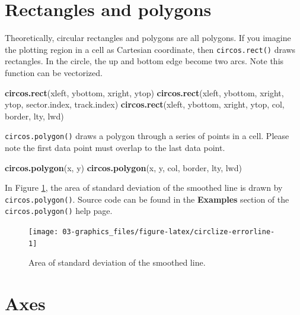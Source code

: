 \documentclass[]{book}
\newenvironment{Shaded}{\begin{snugshade}}{\end{snugshade}}
\newcommand{\KeywordTok}[1]{\textcolor[rgb]{0.13,0.29,0.53}{\textbf{#1}}}
\newcommand{\NormalTok}[1]{#1}
\theoremstyle{definition}
\theoremstyle{definition}
\theoremstyle{remark}
\begin{document}
\section{Rectangles and polygons}\label{rectangles}

Theoretically, circular rectangles and polygons are all polygons. If you
imagine the plotting region in a cell as Cartesian coordinate, then
\texttt{circos.rect()} draws rectangles. In the circle, the up and
bottom edge become two arcs. Note this function can be vectorized.

\begin{Shaded}
\begin{Highlighting}[]
\KeywordTok{circos.rect}\NormalTok{(xleft, ybottom, xright, ytop)}
\KeywordTok{circos.rect}\NormalTok{(xleft, ybottom, xright, ytop, sector.index, track.index)}
\KeywordTok{circos.rect}\NormalTok{(xleft, ybottom, xright, ytop, col, border, lty, lwd)}
\end{Highlighting}
\end{Shaded}

\texttt{circos.polygon()} draws a polygon through a series of points in
a cell. Please note the first data point must overlap to the last data
point.

\begin{Shaded}
\begin{Highlighting}[]
\KeywordTok{circos.polygon}\NormalTok{(x, y)}
\KeywordTok{circos.polygon}\NormalTok{(x, y, col, border, lty, lwd)}
\end{Highlighting}
\end{Shaded}

In Figure \ref{fig:circlize-errorline}, the area of standard deviation
of the smoothed line is drawn by \texttt{circos.polygon()}. Source code
can be found in the \textbf{Examples} section of the
\texttt{circos.polygon()} help page.

\begin{figure}

{\centering \texttt{[image: 03-graphics\_files/figure-latex/circlize-errorline-1]} 

}

\caption{Area of standard deviation of the smoothed line.}\label{fig:circlize-errorline}
\end{figure}

\section{Axes}\label{axes}
\end{document}

